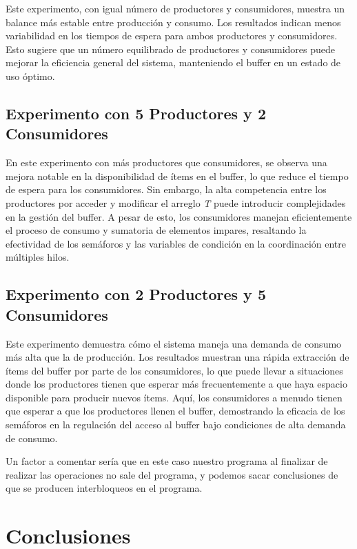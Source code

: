 \documentclass[a4paper,twocolumn]{article}
\begin{document}
Este experimento, con igual número de productores y consumidores, muestra un balance más estable entre producción y consumo. Los resultados indican menos variabilidad en los tiempos de espera para ambos productores y consumidores. Esto sugiere que un número equilibrado de productores y consumidores puede mejorar la eficiencia general del sistema, manteniendo el buffer en un estado de uso óptimo.

\subsection{Experimento con 5 Productores y 2 Consumidores}

En este experimento con más productores que consumidores, se observa una mejora notable en la disponibilidad de ítems en el buffer, lo que reduce el tiempo de espera para los consumidores. Sin embargo, la alta competencia entre los productores por acceder y modificar el arreglo \textit{T} puede introducir complejidades en la gestión del buffer. A pesar de esto, los consumidores manejan eficientemente el proceso de consumo y sumatoria de elementos impares, resaltando la efectividad de los semáforos y las variables de condición en la coordinación entre múltiples hilos.

\subsection{Experimento con 2 Productores y 5 Consumidores}

Este experimento demuestra cómo el sistema maneja una demanda de consumo más alta que la de producción. Los resultados muestran una rápida extracción de ítems del buffer por parte de los consumidores, lo que puede llevar a situaciones donde los productores tienen que esperar más frecuentemente a que haya espacio disponible para producir nuevos ítems. Aquí, los consumidores a menudo tienen que esperar a que los productores llenen el buffer, demostrando la eficacia de los semáforos en la regulación del acceso al buffer bajo condiciones de alta demanda de consumo. 

Un factor a comentar sería que en este caso nuestro programa al finalizar de realizar las operaciones no sale del programa, y podemos sacar conclusiones de que se producen interbloqueos en el programa.

	
\section{Conclusiones}
\end{document}

